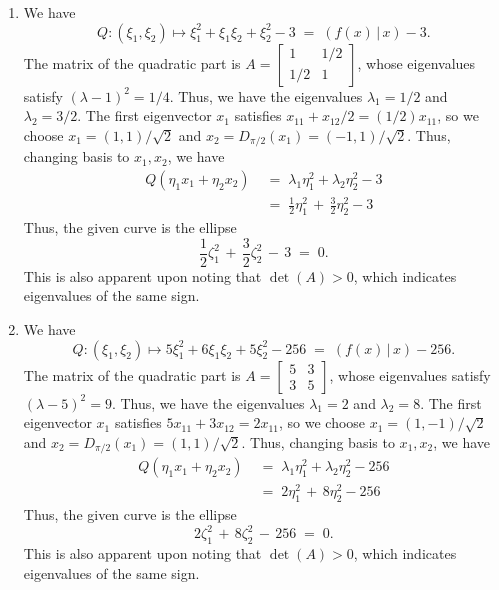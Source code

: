 \documentclass[10pt]{article}
\begin{document}
\begin{enumerate}
                \item 
                We have
                \[Q\colon (\xi_1, \xi_2) \mapsto \xi_1^2 + \xi_1\xi_2 + \xi_2^2 - 3
                \;=\; (f(x) \,|\, x) - 3.\]
                The matrix of the quadratic part is $ A = 
                \begin{bmatrix}
                        1& 1 /2 \\ 1 /2& 1
                \end{bmatrix}$, whose eigenvalues satisfy $(\lambda - 1)^2 = 1 /4$. Thus, we have the eigenvalues $\lambda_1 = 1 /2$ and
                $\lambda_2 = 3 /2$. The first eigenvector $x_1$ satisfies $x_{11} + x_{12}/2 = (1 /2)x_{11}$, so we choose $x_{1} = (1, 1)/\sqrt{2}$
                and $x_2 = D_{\pi/2}(x_1) = (-1, 1)/\sqrt{2}$.
                Thus, changing basis to $x_1, x_2$, we have
                \begin{align*}
                Q(\eta_1x_1 + \eta_2x_2)
                        \;&=\; \lambda_1\eta_1^2 + \lambda_2\eta_2^2 - 3 \\
                        \;&=\; \frac{1}{2}\eta_1^2 \,+\, \frac{3}{2}\eta_2^2 - 3
                \end{align*}
                Thus, the given curve is the ellipse
                \[
                \frac{1}{2}\zeta_1^2 \,+\, \frac{3}{2}\zeta_2^2 \,-\, 3 \;=\; 0.
                \]
                This is also apparent upon noting that $\det(A) > 0$, which indicates eigenvalues of the same sign.

                \item 
                We have
                \[Q\colon (\xi_1, \xi_2) \mapsto 5\xi_1^2 + 6\xi_1\xi_2 + 5\xi_2^2 - 256
                \;=\; (f(x) \,|\, x) - 256.\]
                The matrix of the quadratic part is $ A = 
                \begin{bmatrix}
                        5& 3 \\ 3& 5
                \end{bmatrix}$, whose eigenvalues satisfy $(\lambda - 5)^2 = 9$. Thus, we have the eigenvalues $\lambda_1 = 2$ and
                $\lambda_2 = 8$. The first eigenvector $x_1$ satisfies $5x_{11} + 3x_{12} = 2x_{11}$, so we choose $x_{1} = (1, -1)/\sqrt{2}$
                and $x_2 = D_{\pi/2}(x_1) = (1, 1)/\sqrt{2}$.
                Thus, changing basis to $x_1, x_2$, we have
                \begin{align*}
                Q(\eta_1x_1 + \eta_2x_2)
                        \;&=\; \lambda_1\eta_1^2 + \lambda_2\eta_2^2 - 256 \\
                        \;&=\; 2\eta_1^2 \,+\, 8\eta_2^2 - 256
                \end{align*}
                Thus, the given curve is the ellipse
                \[
                2\zeta_1^2 \,+\, 8\zeta_2^2 \,-\, 256 \;=\; 0.
                \]
                This is also apparent upon noting that $\det(A) > 0$, which indicates eigenvalues of the same sign.
                


\end{enumerate}
\end{document}
